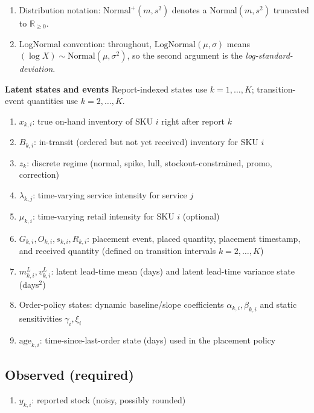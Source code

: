 \documentclass[11pt]{article}
\begin{document}
\begin{enumerate}
  For notation clarity, let $r\in\{1,\dots,R\}$ index regime types and define regime-specific parameter tables
  $\kappa_{r,j},\ \phi_{r,i},\ m^{\mathrm{adj}}_{r,i},\ s^{\mathrm{adj}}_{r,i}$.
  In interval $k$, evaluate these parameters at $r=z_k$ inside likelihood and transition terms.

  \item Distribution notation: $\text{Normal}^+(m,s^2)$ denotes a Normal$(m,s^2)$ truncated to $\mathbb{R}_{\ge 0}$.
  \item LogNormal convention: throughout, $\text{LogNormal}(\mu,\sigma)$ means $(\log X)\sim\text{Normal}(\mu,\sigma^2)$, so the second argument is the \emph{log-standard-deviation}.
\end{enumerate}

\textbf{Latent states and events}
Report-indexed states use $k=1,\dots,K$; transition-event quantities use $k=2,\dots,K$.
\begin{enumerate}
  \item $x_{k,i}$: true on-hand inventory of SKU $i$ right after report $k$
  \item $B_{k,i}$: in-transit (ordered but not yet received) inventory for SKU $i$
  \item $z_k$: discrete regime (normal, spike, lull, stockout-constrained, promo, correction)
  \item $\lambda_{k,j}$: time-varying service intensity for service $j$
  \item $\mu_{k,i}$: time-varying retail intensity for SKU $i$ (optional)
  \item $G_{k,i},O_{k,i},s_{k,i},R_{k,i}$: placement event, placed quantity, placement timestamp, and received quantity (defined on transition intervals $k=2,\dots,K$)
  \item $m^L_{k,i}, v^L_{k,i}$: latent lead-time mean (days) and latent lead-time variance state (days$^2$)
  \item Order-policy states: dynamic baseline/slope coefficients $\alpha_{k,i}, \beta_{k,i}$ and static sensitivities $\gamma_i, \xi_i$
  \item $\text{age}_{k,i}$: time-since-last-order state (days) used in the placement policy
\end{enumerate}

\subsection*{Observed (required)}
\begin{enumerate}
  \item $y_{k,i}$: reported stock (noisy, possibly rounded)
\end{enumerate}
\end{document}
